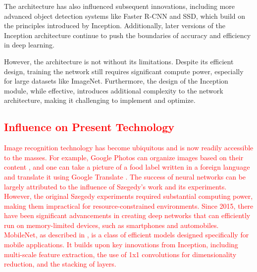 \documentclass{article}
\begin{document}
The architecture has also influenced subsequent innovations, including more advanced object detection systems like Faster R-CNN and SSD, which build on the principles introduced by Inception. Additionally, later versions of the Inception architecture continue to push the boundaries of accuracy and efficiency in deep learning.

However, the architecture is not without its limitations. Despite its efficient design, training the network still requires significant compute power, especially for large datasets like ImageNet. Furthermore, the design of the Inception module, while effective, introduces additional complexity to the network architecture, making it  challenging to implement and optimize.

\textcolor{red}{
\subsection{Influence on Present Technology}
Image recognition technology has become ubiquitous and is now readily accessible to the masses. For example, Google Photos can organize images based on their content \cite{google_photos_updates_2023}, and one can take a picture of a food label written in a foreign language and translate it using Google Translate \cite{google_translate_support_2024}. The success of neural networks can be largely attributed to the influence of Szegedy's work and its experiments. However, the original Szegedy experiments required substantial computing power, making them impractical for resource-constrained environments. Since 2015, there have been significant advancements in creating deep networks that can efficiently run on memory-limited devices, such as smartphones and automobiles. MobileNet, as described in \cite{howard2017mobilenets}, is a class of efficient models designed specifically for mobile applications. It builds upon key innovations from Inception, including multi-scale feature extraction, the use of 1x1 convolutions for dimensionality reduction, and the stacking of layers.}



\end{document}
